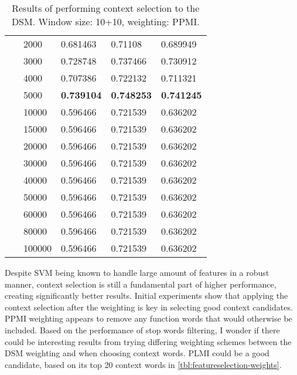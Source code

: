 \begin{table}[H]
\begin{tabular}{lllll}
~               & 2000              & 0.681463          & 0.71108           & 0.689949          \\
~               & 3000              & 0.728748          & 0.737466          & 0.730912          \\
~               & 4000              & 0.707386          & 0.722132          & 0.711321          \\
~               & 5000              & \textbf{0.739104} & \textbf{0.748253} & \textbf{0.741245} \\
~               & 10000             & 0.596466          & 0.721539          & 0.636202          \\
~               & 15000             & 0.596466          & 0.721539          & 0.636202          \\
~               & 20000             & 0.596466          & 0.721539          & 0.636202          \\
~               & 30000             & 0.596466          & 0.721539          & 0.636202          \\
~               & 40000             & 0.596466          & 0.721539          & 0.636202          \\
~               & 50000             & 0.596466          & 0.721539          & 0.636202          \\
~               & 60000             & 0.596466          & 0.721539          & 0.636202          \\
~               & 80000             & 0.596466          & 0.721539          & 0.636202          \\
~               & 100000            & 0.596466          & 0.721539          & 0.636202          \\
\hline
\end{tabular}
    \caption{Results of performing context selection to the DSM. Window size: 10+10, weighting: PPMI.}
    \label{tbl:results-feature-selection}
\end{table}

Despite SVM being known to handle large amount of features in a robust manner, context selection is still a fundamental part of higher performance, creating significantly better results. Initial experiments show that applying the context selection after the weighting is key in selecting good context candidates. PPMI weighting appears to remove any function words that would otherwise be included. Based on the performance of stop words filtering, I wonder if there could be interesting results from trying differing weighting schemes between the DSM weighting and when choosing context words. PLMI could be a good candidate, based on its top 20 context words in \cref{tbl:featureselection-weights}.

